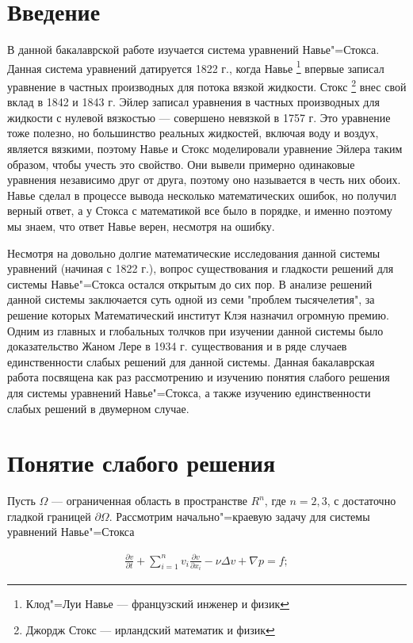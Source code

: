 \section*{Введение}
В данной бакалаврской работе изучается система уравнений Навье"=Стокса. Данная система уравнений датируется 1822 г., когда
Навье \footnote{Клод"=Луи Навье --- французский инженер и физик} впервые записал уравнение в частных производных для потока
вязкой жидкости. Стокс \footnote{Джордж Стокс --- ирландский математик и физик} внес свой вклад в 1842 и 1843 г. Эйлер
записал уравнения в частных производных для жидкости с нулевой вязкостью --- совершено невязкой в 1757 г. Это уравнение
тоже полезно, но большинство реальных жидкостей, включая воду и воздух, является вязкими, поэтому Навье и Стокс
моделировали уравнение Эйлера таким образом, чтобы учесть это свойство. Они вывели примерно одинаковые уравнения независимо
друг от друга, поэтому оно называется в честь них обоих. Навье сделал в процессе вывода несколько математических ошибок, но
получил верный ответ, а у Стокса с математикой все было в порядке, и именно поэтому мы знаем, что ответ Навье верен, несмотря
на ошибку.

Несмотря на довольно долгие математические исследования данной системы уравнений (начиная с 1822 г.), вопрос существования и
гладкости решений для системы Навье"=Стокса остался открытым до сих пор. В анализе решений данной системы заключается суть
одной из семи "проблем тысячелетия", за решение которых Математический институт Клэя назначил огромную премию. Одним из
главных и глобальных толчков при изучении данной системы было доказательство Жаном Лере в 1934 г. существования и в ряде
случаев единственности слабых решений для данной системы. Данная бакалаврская работа посвящена как раз рассмотрению и
изучению понятия слабого решения для системы уравнений Навье"=Стокса, а также изучению единственности слабых решений
в двумерном случае.


\clearpage
\section {Понятие слабого решения}
Пусть $\Omega$ --- ограниченная область в пространстве $R^n$, где $n=2, 3$, с достаточно гладкой границей $\partial\Omega$.
Рассмотрим начально"=краевую задачу для системы уравнений Навье"=Стокса

\begin{equation}\label{eq:5.1}
    \begin{gathered}
        \frac{\partial v}{\partial t}+\sum_{i=1}^nv_i\frac{\partial v}{\partial x_i}-\nu\Delta v+\nabla p=f;
    \end{gathered}
\end{equation}

